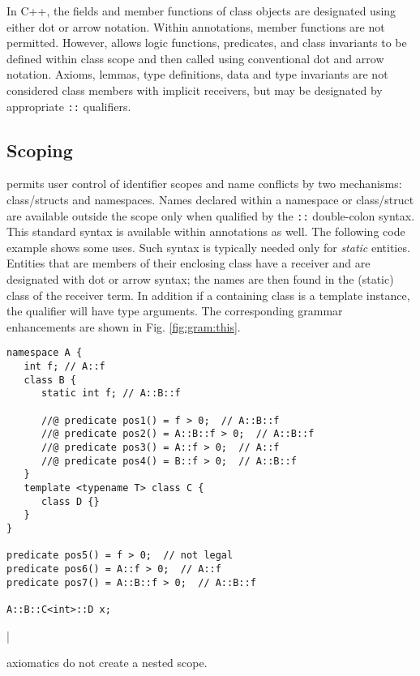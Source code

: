 In C++, the fields and member functions of class objects are designated using 
either dot or arrow notation. Within \NAME{} annotations, \lang{} member functions are not
permitted. However, \NAME{} allows logic functions, predicates, and class invariants to be defined
within class scope and then called using conventional \lang{} dot and arrow notation.
Axioms, lemmas, type definitions, data and type invariants are not considered class members with implicit receivers,
but may be designated by appropriate \lstinline|::| qualifiers.

\subsection{Scoping}

\lang{} permits user control of identifier scopes and name conflicts by two mechanisms: class/structs and namespaces. 
Names declared within a namespace or class/struct are available outside the scope only when qualified by the
\lstinline|::| double-colon syntax. This standard \lang{} syntax is available within \NAME{} annotations as well.
The following code example shows some uses. Such syntax is typically needed only for \textit{static} entities.
Entities that are members of their enclosing class have a receiver and are designated with dot or arrow syntax;
the names are then found in the (static) class of the receiver term. In addition if a containing class is a template
instance, the qualifier will have type arguments. The corresponding grammar enhancements are shown in Fig. \ref{fig:gram:this}.
\begin{lstlisting}
namespace A {
   int f; // A::f
   class B {
      static int f; // A::B::f
      
      //@ predicate pos1() = f > 0;  // A::B::f
      //@ predicate pos2() = A::B::f > 0;  // A::B::f
      //@ predicate pos3() = A::f > 0;  // A::f
      //@ predicate pos4() = B::f > 0;  // A::B::f   
   }
   template <typename T> class C {
      class D {}
   }
}

predicate pos5() = f > 0;  // not legal
predicate pos6() = A::f > 0;  // A::f
predicate pos7() = A::B::f > 0;  // A::B::f

A::B::C<int>::D x;
\end{lstlisting}|

\NAME{} axiomatics do not create a nested scope.



